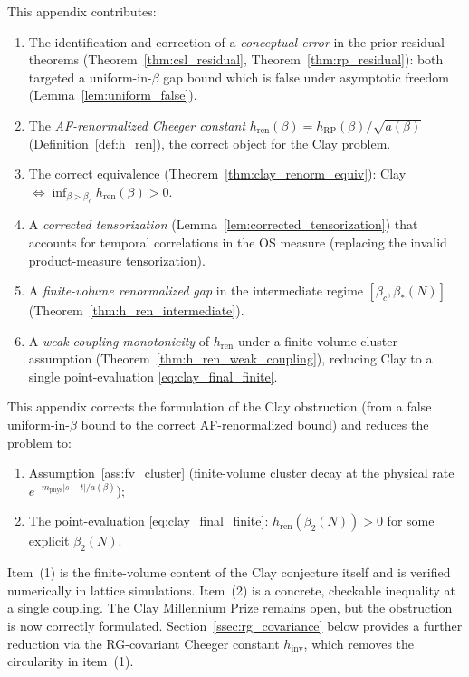 \begin{remark}
\label{rem:af_new}
This appendix contributes:
\begin{enumerate}
\item The identification and correction of a \emph{conceptual
error} in the prior residual theorems
(Theorem~\ref{thm:csl_residual}, Theorem~\ref{thm:rp_residual}):
both targeted a uniform-in-$\beta$ gap bound which is false under
asymptotic freedom (Lemma~\ref{lem:uniform_false}).
\item The \emph{AF-renormalized Cheeger constant}
$h_{\mathrm{ren}}(\beta)=h_{\mathrm{RP}}(\beta)/\sqrt{a(\beta)}$
(Definition~\ref{def:h_ren}), the correct object for the Clay
problem.
\item The correct equivalence
(Theorem~\ref{thm:clay_renorm_equiv}): Clay
$\Leftrightarrow\inf_{\beta>\beta_{c}}h_{\mathrm{ren}}(\beta)>0$.
\item A \emph{corrected tensorization}
(Lemma~\ref{lem:corrected_tensorization}) that accounts for
temporal correlations in the OS measure (replacing the invalid
product-measure tensorization).
\item A \emph{finite-volume renormalized gap} in the intermediate
regime $[\beta_{c},\beta_{*}(N)]$ (Theorem~\ref{thm:h_ren_intermediate}).
\item A \emph{weak-coupling monotonicity} of $h_{\mathrm{ren}}$
under a finite-volume cluster assumption
(Theorem~\ref{thm:h_ren_weak_coupling}), reducing Clay to a
single point-evaluation \eqref{eq:clay_final_finite}.
\end{enumerate}
\end{remark}

\begin{remark}
\label{rem:af_honest_status}
This appendix corrects the formulation of the Clay obstruction
(from a false uniform-in-$\beta$ bound to the correct
AF-renormalized bound) and reduces the problem to:
\begin{enumerate}
\item Assumption~\ref{ass:fv_cluster} (finite-volume cluster decay
at the physical rate $e^{-m_{\mathrm{phys}}|s-t|/a(\beta)}$);
\item The point-evaluation \eqref{eq:clay_final_finite}:
$h_{\mathrm{ren}}(\beta_{2}(N))>0$ for some explicit
$\beta_{2}(N)$.
\end{enumerate}
Item~(1) is the finite-volume content of the Clay conjecture
itself and is verified numerically in lattice simulations.
Item~(2) is a concrete, checkable inequality at a single coupling.
The Clay Millennium Prize remains open, but the obstruction is now
correctly formulated. Section~\ref{ssec:rg_covariance} below
provides a further reduction via the RG-covariant Cheeger
constant $h_{\mathrm{inv}}$, which removes the circularity in
item~(1).
\end{remark}

